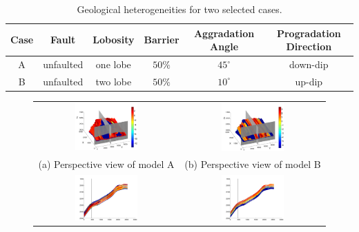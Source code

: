 \begin{table}
\center
\caption{Geological heterogeneities for two selected cases.}
\begin{tabular}{|c|c|c|c|c|c|}
\hline
Case & Fault&Lobosity&Barrier&Aggradation Angle&Progradation Direction\\
\hline
A&unfaulted&one lobe&$50\%$&$45^{\circ}$&down-dip\\
\hline
B&unfaulted&two lobe&$50\%$&$10^{\circ}$&up-dip\\
\hline
\end{tabular}
\label{tab:AaB}
\end{table}

\begin{figure}
\begin{tabular}{cc}
\includegraphics[width=0.45\textwidth]{./figurer/C02222_LogKz_pers}&
\includegraphics[width=0.45\textwidth]{./figurer/C03211_LogKz_pers} \\ 
(a) Perspective view of model A&(b) Perspective view of model B\\
\includegraphics[width=0.45\textwidth]{./figurer/C02222_LogKz_slcx}&
\includegraphics[width=0.45\textwidth]{./figurer/C03211_LogKz_slcx}

\end{tabular}
\end{figure}
